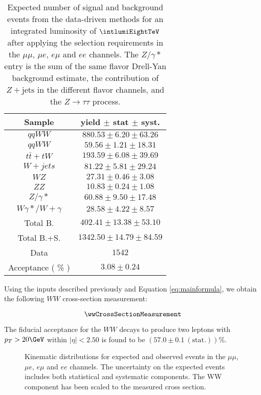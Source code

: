 \begin{table}[ht!]
  \begin{center}
  \begin{tabular} {|c|c|}
\hline
Sample & yield $\pm$ stat $\pm$ syst. \\ \hline
$qqWW$  & $880.53 \pm 6.20 \pm 63.26 $  \\
$qqWW$  & $59.56 \pm 1.21 \pm 18.31 $   \\
$t\bar{t} + tW$ & $193.59 \pm 6.08 \pm 39.69 $  \\
$W+jets$    & $81.22 \pm 5.81 \pm 29.24 $   \\
$WZ$    & $27.31 \pm 0.46 \pm 3.08 $    \\
$ZZ$    & $10.83 \pm 0.24 \pm 1.08 $    \\
$Z/\gamma*$ & $60.88 \pm 9.50 \pm 17.48 $   \\
$W\gamma*/W+\gamma$ & $28.58 \pm 4.22 \pm 8.57 $    \\
\hline \hline
Total B.    & $402.41 \pm 13.38 \pm 53.10 $ \\ \hline \hline
Total B.+S. & $1342.50 \pm 14.79 \pm 84.59 $    \\ \hline \hline
Data    & $1542$    \\ \hline \hline
Acceptance ( \% )   & $3.08 \pm 0.24    $\\\hline
\end{tabular}
  \caption{\fixme Expected number of signal and background events from the data-driven methods for
  an integrated luminosity of $\intlumiEightTeV$ after applying the selection requirements 
in the $\mu\mu$, $\mu{e}$, $e\mu$ and $ee$  channels.
The $Z/\gamma*$ entry is the sum of the same flavor Drell-Yan background estimate,
the contribution of $Z+\mathrm{jets}$ in the different flavor channels,
and the $Z\rightarrow\tau\tau$ process.
}
   \label{tab:data_yields}
  \end{center}
\end{table}

Using the inputs described previously and Equation \ref{eq:mainformula},
we obtain the following $WW$ cross-section measurement:

\begin{equation*}
\wwCrossSectionMeasurement
\end{equation*}

The fiducial acceptance for the $WW$ decays to produce two leptons 
with $p_{T}>20\GeV$ within $|\eta|<2.50$ is found to be $(57.0\pm0.1~\mathrm{(stat.)})\%$.

\begin{figure}[!hbtp]
\centering
\caption{Kinematic distributions for expected and observed events in the  $\mu\mu$, $\mu{e}$, $e\mu$ and $ee$ channels.
The uncertainty on the expected events includes both statistical and systematic components.
The WW component has been scaled to the measured cross section.}
\label{fig:xs_kinematics}
\end{figure}

